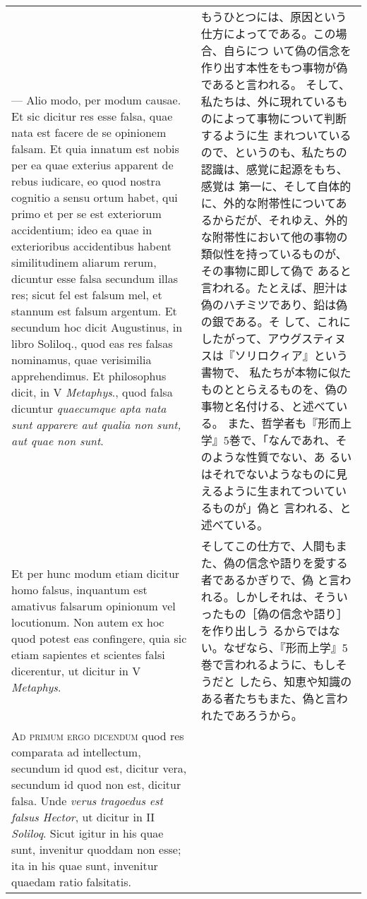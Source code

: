 \documentclass[10pt]{jsarticle} %
\begin{document}
\begin{longtable}{p{21em}p{21em}}
\\



--- Alio modo, per modum causae. Et sic dicitur res esse
falsa, quae nata est facere de se opinionem falsam. Et quia innatum est
nobis per ea quae exterius apparent de rebus iudicare, eo quod nostra
cognitio a sensu ortum habet, qui primo et per se est exteriorum
accidentium; ideo ea quae in exterioribus accidentibus habent
similitudinem aliarum rerum, dicuntur esse falsa secundum illas res;
sicut fel est falsum mel, et stannum est falsum argentum. Et secundum
hoc dicit Augustinus, in libro Soliloq., quod eas res falsas nominamus,
quae verisimilia apprehendimus. Et philosophus dicit, in V {\itshape
Metaphys}., quod falsa dicuntur {\itshape quaecumque apta nata sunt
apparere aut qualia non sunt, aut quae non sunt}. 

&

もうひとつには、原因という仕方によってである。この場合、自らにつ
 いて偽の信念を作り出す本性をもつ事物が偽であると言われる。
そして、私たちは、外に現れているものによって事物について判断するように生
 まれついているので、というのも、私たちの認識は、感覚に起源をもち、感覚は
 第一に、そして自体的に、外的な附帯性についてあるからだが、それゆえ、外的
 な附帯性において他の事物の類似性を持っているものが、その事物に即して偽で
 あると言われる。たとえば、胆汁は偽のハチミツであり、鉛は偽の銀である。そ
 して、これにしたがって、アウグスティヌスは『ソリロクィア』という書物で、
 私たちが本物に似たものととらえるものを、偽の事物と名付ける、と述べている。
 また、哲学者も『形而上学』5巻で、「なんであれ、そのような性質でない、あ
 るいはそれでないようなものに見えるように生まれてついているものが」偽と
 言われる、と述べている。

\\

Et per hunc modum
etiam dicitur homo falsus, inquantum est amativus falsarum opinionum vel
locutionum. Non autem ex hoc quod potest eas confingere, quia sic etiam
sapientes et scientes falsi dicerentur, ut dicitur in V {\itshape
Metaphys}.

&
そしてこの仕方で、人間もまた、偽の信念や語りを愛する者であるかぎりで、偽
 と言われる。しかしそれは、そういったもの［偽の信念や語り］を作り出しう
 るからではない。なぜなら、『形而上学』5巻で言われるように、もしそうだと
 したら、知恵や知識のある者たちもまた、偽と言われたであろうから。

\\


{\scshape Ad primum ergo dicendum} quod res comparata ad intellectum,
secundum id quod est, dicitur vera, secundum id quod non est, dicitur
falsa. Unde {\itshape verus tragoedus est falsus Hector}, ut dicitur in
II {\itshape Soliloq}. Sicut igitur in his quae sunt, invenitur quoddam
non esse; ita in his quae sunt, invenitur quaedam ratio falsitatis.


\end{longtable}
\end{document}

